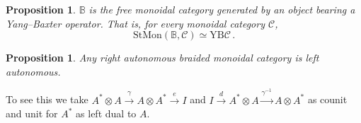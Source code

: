 \documentclass{beamer}
\newcommand{\lra}{\longrightarrow}
\def\CC{{\mathscr C}}
\newtheorem{proposition}[theorem]{Proposition}
\begin{document}
\begin{frame}

\begin{proposition} 
$\mathbb{B}$  is the free monoidal category generated by an object bearing a Yang--Baxter operator.   That is, for every monoidal category $\CC$, 
\[
\mathrm{StMon}(\mathbb{B},\CC) \simeq \mathrm{YB}\CC\,.
\]
\end{proposition} 
\begin{proposition} 
Any right autonomous braided monoidal category is left autonomous.
\end{proposition} 

To see this we take $A^\ast \otimes A \stackrel{\gamma}{\lra}  A \otimes A^\ast   \stackrel{e}{\lra}  I$ 
and $I   \stackrel{d}{\lra}  A^\ast \otimes A \stackrel{\gamma^{-1}}{\lra}  A \otimes A^\ast$ as counit 
and unit for $A^\ast$ as left dual to $A$. 
\end{frame}
\end{document}
